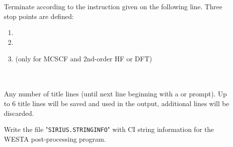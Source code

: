 \begin{description}
\item[] \ \\
   \\
  Terminate {\sir} according to the instruction given on the following line.
  Three stop points are defined:
\begin{enumerate}

\item \hspace{2em} 

\item \hspace{2em} 

\item \hspace{2em}  (only for MCSCF and 2nd-order HF or DFT)
\end{enumerate}

\item[]  \ \\
   \ \\ 
  Any number of title lines (until next line beginning with a
   or \quotekw{*} prompt).
  Up to 6 title lines will be saved and used in the output, additional
  lines will be discarded.

\item[]
  Write the file "\verb|SIRIUS.STRINGINFO|" with CI string information for the WESTA post-processing program.

\end{description}



